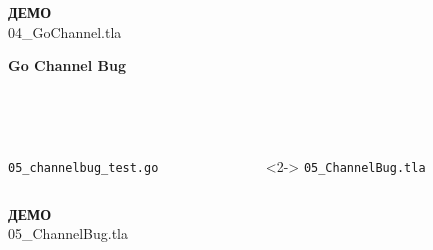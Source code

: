 \documentclass[
  11pt,aspectratio=1610,pdf,hyperref={unicode,colorlinks=false}
]{beamer}
\begin{document}
\begin{frame}[c]
  \centering
  {\Large\bf ДЕМО}\\[2ex]
  {\normalsize\ttfamily\textcolor{black!80}{04\_GoChannel.tla}}
\end{frame}

\begin{frame}[t,fragile]
  \begin{minipage}{\textwidth}
      \centering%
      {\Large\bf Go Channel Bug\\}~%
  \end{minipage}\\[2ex]%
  \begin{minipage}{\textwidth}
    \begin{columns}[T]
      \begin{column}{.5\textwidth}
        {\scriptsize\textcolor{black!50}{\Verb|05_channelbug_test.go|}}\\[-1ex]
      \end{column}
      \begin{column}{.5\textwidth}<2->
        {\scriptsize\textcolor{black!50}{\Verb|05_ChannelBug.tla|}}\\[-1ex]
      \end{column}
    \end{columns}
  \end{minipage}
\end{frame}

\begin{frame}[c]
  \centering
  {\Large\bf ДЕМО}\\[2ex]
  {\normalsize\ttfamily\textcolor{black!80}{05\_ChannelBug.tla}}
\end{frame}
\end{document}
